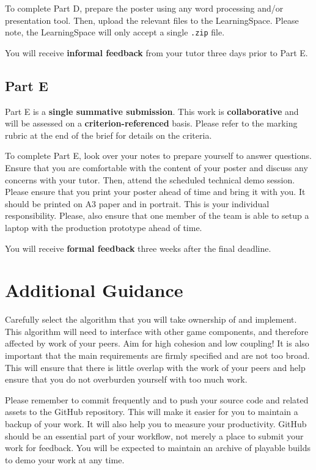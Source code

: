 \documentclass{../fal_assignment}
\begin{document}
To complete Part D, prepare the poster using any word processing and/or presentation tool. Then, upload the relevant files to the LearningSpace. Please note, the LearningSpace will only accept a single \texttt{.zip} file.

You will receive \textbf{informal feedback} from your tutor three days prior to Part E.

\subsection*{Part E}

Part E is a \textbf{single summative submission}. This work is \textbf{collaborative} and will be assessed on a \textbf{criterion-referenced} basis. Please refer to the marking rubric at the end of the brief for details on the criteria.

To complete Part E, look over your notes to prepare yourself to answer questions. Ensure that you are comfortable with the content of your poster and discuss any concerns with your tutor. Then, attend the scheduled technical demo session. Please ensure that you print your poster ahead of time and bring it with you. It should be printed on A3 paper and in portrait. This is your individual responsibility. Please, also ensure that one member of the team is able to setup a laptop with the production prototype ahead of time.

You will receive \textbf{formal feedback} three weeks after the final deadline.

\section*{Additional Guidance}

Carefully select the algorithm that you will take ownership of and implement. This algorithm will need to interface with other game components, and therefore affected by work of your peers. Aim for high cohesion and low coupling! It is also important that the main requirements are firmly specified and are not too broad. This will ensure that there is little overlap with the work of your peers and help ensure that you do not overburden yourself with too much work. 

Please remember to commit frequently and to push your source code and related assets to the GitHub repository. This will make it easier for you to maintain a backup of your work. It will also help you to measure your productivity. GitHub should be an essential part of your workflow, not merely a place to submit your work for feedback. You will be expected to maintain an archive of playable builds to demo your work at any time.
\end{document}
